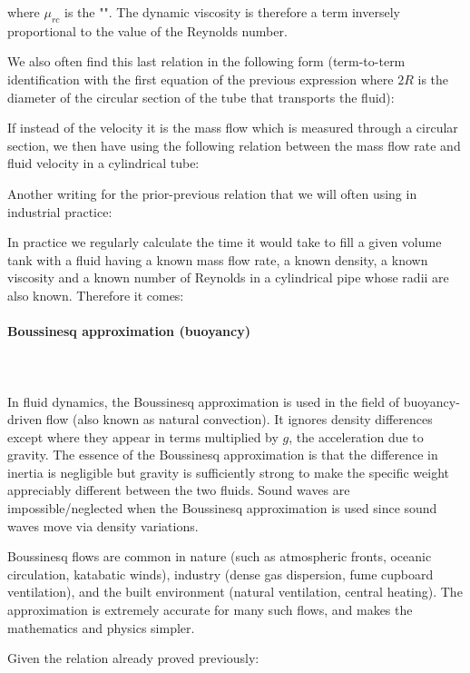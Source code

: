	where $\mu_{rc}$ is the "". The dynamic viscosity is therefore a term inversely proportional to the value of the Reynolds number.

	We also often find this last relation in the following form (term-to-term identification with the first equation of the previous expression where $2R$ is the diameter of the circular section of the tube that transports the fluid):
	
	If instead of the velocity it is the mass flow which is measured through a circular section, we then have using the following relation between the mass flow rate and fluid velocity in a cylindrical tube:
	
	Another writing for the prior-previous relation that we will often using in industrial practice:
	
	In practice we regularly calculate the time it would take to fill a given volume tank with a fluid having a known mass flow rate, a known  density, a known  viscosity and a known number of Reynolds in a cylindrical pipe whose radii are also known. Therefore it comes:
	
	
	\pagebreak
	\paragraph{Boussinesq approximation (buoyancy)}\mbox{}\\\\
	In fluid dynamics, the Boussinesq approximation is used in the field of buoyancy-driven flow (also known as natural convection). It ignores density differences except where they appear in terms multiplied by $g$, the acceleration due to gravity. The essence of the Boussinesq approximation is that the difference in inertia is negligible but gravity is sufficiently strong to make the specific weight appreciably different between the two fluids. Sound waves are impossible/neglected when the Boussinesq approximation is used since sound waves move via density variations.

	Boussinesq flows are common in nature (such as atmospheric fronts, oceanic circulation, katabatic winds), industry (dense gas dispersion, fume cupboard ventilation), and the built environment (natural ventilation, central heating). The approximation is extremely accurate for many such flows, and makes the mathematics and physics simpler.
	
	Given the relation already proved previously:
	
